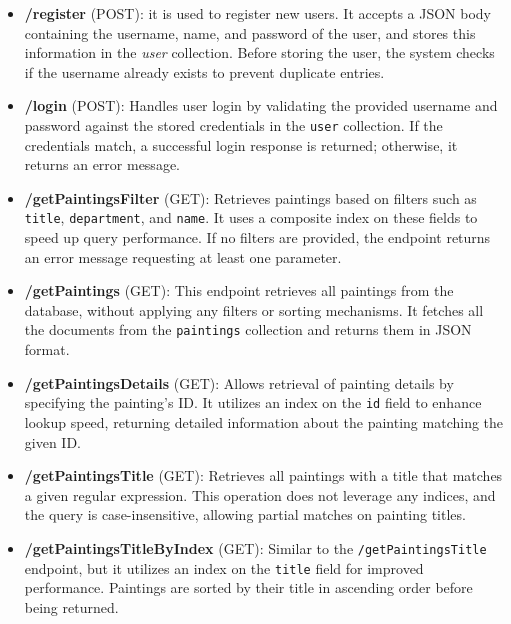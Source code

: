 \documentclass[a4paper,12pt]{article}
\begin{document}
\begin{itemize} 
    
    \item \textbf{/register} (POST): it is used to register new users. It accepts a JSON body containing the username, name, and password of the user, and stores this information in the \textit{user} collection. Before storing the user, the system checks if the username already exists to prevent duplicate entries.


    \item \textbf{/login} (POST): Handles user login by validating the provided username and password against the stored credentials in the \texttt{user} collection. If the credentials match, a successful login response is returned; otherwise, it returns an error message.

    \item \textbf{/getPaintingsFilter} (GET): Retrieves paintings based on filters such as \texttt{title}, \texttt{department}, and \texttt{name}. It uses a composite index on these fields to speed up query performance. If no filters are provided, the endpoint returns an error message requesting at least one parameter.

    \item \textbf{/getPaintings} (GET): This endpoint retrieves all paintings from the database, without applying any filters or sorting mechanisms. It fetches all the documents from the \texttt{paintings} collection and returns them in JSON format.

    \item \textbf{/getPaintingsDetails} (GET): Allows retrieval of painting details by specifying the painting's ID. It utilizes an index on the \texttt{id} field to enhance lookup speed, returning detailed information about the painting matching the given ID.

    \item \textbf{/getPaintingsTitle} (GET): Retrieves all paintings with a title that matches a given regular expression. This operation does not leverage any indices, and the query is case-insensitive, allowing partial matches on painting titles.

    \item \textbf{/getPaintingsTitleByIndex} (GET): Similar to the \texttt{/getPaintingsTitle} endpoint, but it utilizes an index on the \texttt{title} field for improved performance. Paintings are sorted by their title in ascending order before being returned.


\end{itemize}
\end{document}
